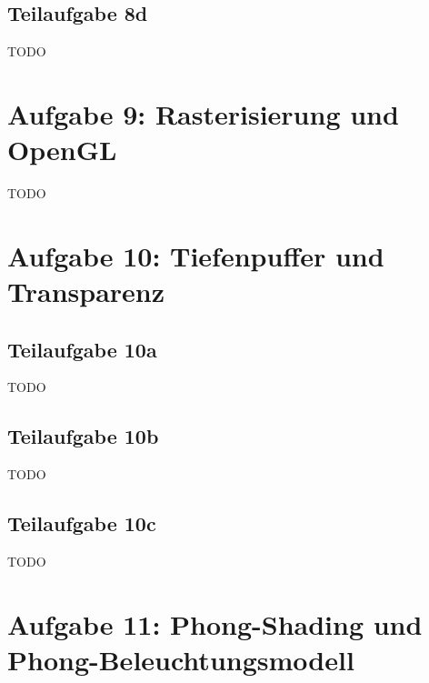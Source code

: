 \documentclass[a4paper]{scrartcl}
\begin{document}
\subsection*{Teilaufgabe 8d}
TODO

\section*{Aufgabe 9: Rasterisierung und OpenGL}
TODO

\section*{Aufgabe 10: Tiefenpuffer und Transparenz}
\subsection*{Teilaufgabe 10a}
TODO
\subsection*{Teilaufgabe 10b}
TODO
\subsection*{Teilaufgabe 10c}
TODO

\section*{Aufgabe 11: Phong-Shading und Phong-Beleuchtungsmodell}
\inputminted[linenos, numbersep=5pt, tabsize=4, frame=lines, label=shader.vert]{glsl}{shader.vert}
\end{document}
